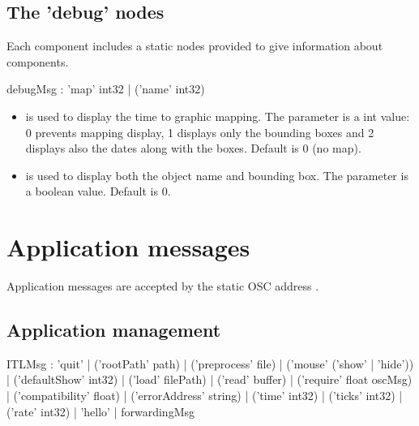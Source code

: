 \documentclass[a4paper,twoside]{report}
\newcommand{\toplevel}[1]	{\chapter{#1}}
\newcommand{\sublevel}[1]	{\section{#1}}
\begin{document}
\sublevel{The 'debug' nodes}
\label{debugnode}

Each component includes a static  nodes provided to give information about components.


\begin{rail}
debugMsg : 'map' int32
		| ('name' int32) 
\end{rail}

\begin{itemize}
\item {} is used to display the time to graphic mapping. The parameter is a int value: 0 prevents mapping display, 1 displays only the bounding boxes and 2 displays also the dates along with the boxes. Default is 0 (no map).
\item {} is used to display both the object name and bounding box. The parameter is a boolean value. Default is 0.
\end{itemize}


\toplevel{Application messages}
\label{ITL}
Application messages are accepted by the static OSC address . 


\sublevel{Application management}
\label{applmgmt}


\begin{rail}
ITLMsg : 'quit' 
		| ('rootPath' path) 
		| ('preprocess' file) 
		| ('mouse' ('show' | 'hide'))
		| ('defaultShow' int32)
		| ('load' filePath)
		| ('read' buffer)
		| ('require' float oscMsg)
		| ('compatibility' float)
		| ('errorAddress' string)
		| ('time' int32)
		| ('ticks' int32)
		| ('rate' int32)
		| 'hello'
		| forwardingMsg
\end{rail}
\end{document}
